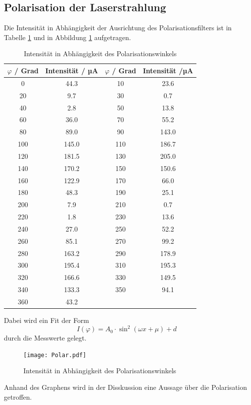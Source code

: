 \subsection{Polarisation der Laserstrahlung}
Die Intensität in Abhängigkeit der Ausrichtung des Polarisationsfilters ist in Tabelle \ref{tab:Pol} und in Abbildung \ref{fig:Pol} aufgetragen.
\begin{table}
  \centering
  \begin{tabular}{c c | c c}
    \toprule
    $\varphi$ / Grad & Intensität / µA & $\varphi$ / Grad & Intensität /µA \\
    \midrule
	0	& 44.3	& 10	& 23.6	\\
	20	& 9.7	& 30	& 0.7	\\
	40	& 2.8	& 50	& 13.8	\\
	60	& 36.0	& 70	& 55.2	\\
	80	& 89.0	& 90	& 143.0	\\
	100	& 145.0	& 110	& 186.7	\\
	120	& 181.5	& 130	& 205.0	\\
	140	& 170.2	& 150	& 150.6	\\
	160	& 122.9	& 170	& 66.0	\\
	180	& 48.3	& 190	& 25.1	\\
	200	& 7.9	& 210	& 0.7	\\
	220	& 1.8	& 230	& 13.6	\\
	240	& 27.0	& 250	& 52.2	\\
	260	& 85.1	& 270	& 99.2	\\
	280	& 163.2	& 290	& 178.9	\\
	300	& 195.4	& 310	& 195.3	\\
	320	& 166.6	& 330	& 149.5	\\
	340	& 133.3 & 350	& 94.1	\\
	360	& 43.2	\\
    \bottomrule
  \end{tabular}
  \caption{Intensität in Abhängigkeit des Polarisationswinkels}
  \label{tab:Pol}
\end{table}
Dabei wird ein Fit der Form
\begin{equation}
  I(\varphi) = A_0 \cdot \sin^2(\omega x + \mu) + d
  \label{eqn:pfit}
\end{equation}
durch die Messwerte gelegt.
\begin{figure}
  \centering
  \texttt{[image: Polar.pdf]}
  \caption{Intensität in Abhängigkeit des Polarisationswinkels}
  \label{fig:Pol}
\end{figure}
Anhand des Graphens wird in der Disskussion eine Aussage über die Polarisation getroffen.
